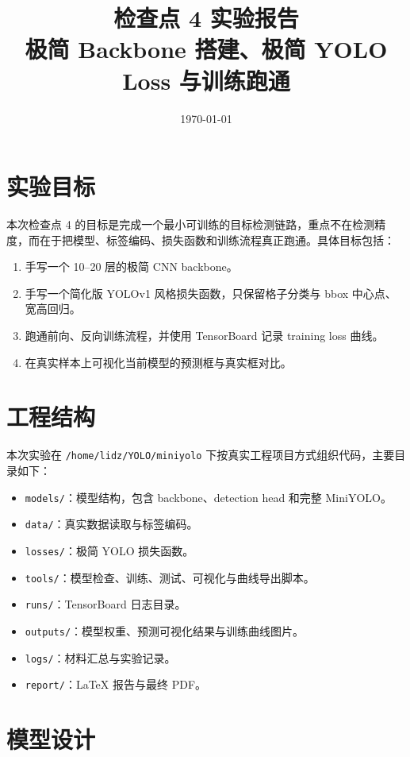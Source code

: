 \documentclass[11pt,a4paper]{article}
\title{检查点 4 实验报告\\极简 Backbone 搭建、极简 YOLO Loss 与训练跑通}
\author{}
\date{\today}
\begin{document}
\maketitle
\tableofcontents
\newpage

\section{实验目标}

本次检查点 4 的目标是完成一个最小可训练的目标检测链路，重点不在检测精度，而在于把模型、标签编码、损失函数和训练流程真正跑通。具体目标包括：

\begin{enumerate}
  \item 手写一个 10--20 层的极简 CNN backbone。
  \item 手写一个简化版 YOLOv1 风格损失函数，只保留格子分类与 bbox 中心点、宽高回归。
  \item 跑通前向、反向训练流程，并使用 TensorBoard 记录 training loss 曲线。
  \item 在真实样本上可视化当前模型的预测框与真实框对比。
\end{enumerate}

\section{工程结构}

本次实验在 \texttt{/home/lidz/YOLO/miniyolo} 下按真实工程项目方式组织代码，主要目录如下：

\begin{itemize}
  \item \texttt{models/}：模型结构，包含 backbone、detection head 和完整 MiniYOLO。
  \item \texttt{data/}：真实数据读取与标签编码。
  \item \texttt{losses/}：极简 YOLO 损失函数。
  \item \texttt{tools/}：模型检查、训练、测试、可视化与曲线导出脚本。
  \item \texttt{runs/}：TensorBoard 日志目录。
  \item \texttt{outputs/}：模型权重、预测可视化结果与训练曲线图片。
  \item \texttt{logs/}：材料汇总与实验记录。
  \item \texttt{report/}：LaTeX 报告与最终 PDF。
\end{itemize}

\section{模型设计}
\end{document}
